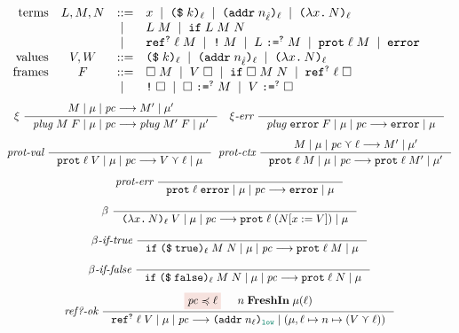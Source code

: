 {\begin{figure}[tbp]
  \raggedright
  {\small \[
  \begin{array}{rcll}
    \text{terms}  & L , M , N & ::=  & x \;\mid\; \text{\texttt{{(\$}}}\;{k}\text{\texttt{{)}}}_{\ell} \;\mid\; \text{\texttt{{(addr}}}\;{n_{\hat{\ell}}}\text{\texttt{{)}}}_{\ell} \;\mid\; \text{\texttt{{(${\lambda}$}}}{x}\text{\texttt{{.}}}\,{N}\text{\texttt{{)}}}_{\ell} \\
                           &  & \;\mid\; & L \; M \;\mid\; \text{\texttt{{if}}}\;{L}\;{M}\;{N} \\
                           &  & \;\mid\; & \text{\texttt{{ref}}}^{\text{\texttt{{?}}}}\;{\ell}\;{M} \;\mid\; \text{\texttt{{!}}}\;{M} \;\mid\; {L}\;\text{\texttt{{:=}}}^{\text{\texttt{{?}}}}\;{M} \;\mid\; \text{\texttt{{prot}}}\;{\ell}\;{M} \;\mid\; \mathtt{error} \\
    \text{values}     & V, W     & ::=  & \text{\texttt{{(\$}}}\;{k}\text{\texttt{{)}}}_{\ell} \;\mid\; \text{\texttt{{(addr}}}\;{n_{\hat{\ell}}}\text{\texttt{{)}}}_{\ell} \;\mid\; \text{\texttt{{(${\lambda}$}}}{x}\text{\texttt{{.}}}\,{N}\text{\texttt{{)}}}_{\ell} \\
    \text{frames} & F & ::= & \Box\;M \;\mid\; V\;\Box \;\mid\; \text{\texttt{{if}}}\;{\Box}\;{M}\;{N} \;\mid\; \text{\texttt{{ref}}}^{\text{\texttt{{?}}}}\;{\ell}\;{\Box} \\
                          & & \;\mid\; & \text{\texttt{{!}}}\;{\Box} \;\mid\; {\Box}\;\text{\texttt{{:=}}}^{\text{\texttt{{?}}}}\;{M} \;\mid\; {V}\;\text{\texttt{{:=}}}^{\text{\texttt{{?}}}}\;{\Box}
  \end{array}
  \]}
  {\small
  \begin{gather*}
  \xi~
  \inference
  {\reduce{M}{\mu}{\pc}{M'}{\mu'}}
  {\reduce{\mathit{plug}\;M\;F}{\mu}{\pc}{\mathit{plug}\;M'\;F}{\mu'}}
  \quad
  \xi\textit{-err}~
  \inference{}{\reduce{\mathit{plug}\;\key{error}\;F}{\mu}{\pc}{\key{error}}{\mu}}
  \\[1ex]
  \textit{prot-val}~
  \inference{}{\reduce{\dynprot{\ell}{V}}{\mu}{\pc}{V \curlyvee \ell}{\mu}}
  \;\;
  \textit{prot-ctx}~
  \inference
  {\reduce{M}{\mu}{\pc \curlyvee \ell}{M'}{\mu'}}
  {\reduce{\dynprot{\ell}{M}}{\mu}{\pc}{\dynprot{\ell}{M'}}{\mu'}}
  \\[1ex]
  \textit{prot-err}~
  \inference{}{\reduce{\dynprot{\ell}{\key{error}}}{\mu}{\pc}{\key{error}}{\mu}}
  \\[1ex]
  \beta~
  \inference{}{\reduce{\dynlam{x}{N}{\ell} \; V}{\mu}{\pc}{\dynprot{\ell}{(N [x := V])}}{\mu}}
  \\[1ex]
  \beta\textit{-if-true}~
  \inference{}{\reduce{\dynif{\dynconst{\true}{\ell}}{M}{N}}{\mu}{\pc}{\dynprot{\ell}{M}}{\mu}}
  \\[1ex]
  \beta\textit{-if-false}~
  \inference{}{\reduce{\dynif{\dynconst{\false}{\ell}}{M}{N}}{\mu}{\pc}{\dynprot{\ell}{N}}{\mu}}
  \\[1ex]
  \textit{ref?-ok}~
  \inference
  {\highlightred{\pc \preccurlyeq \ell} & n \; \mathbf{FreshIn} \; \mu(\ell)}
  {\reduce{\dynref{?}{\ell}{V}}{\mu}{\pc}{\dynaddr{n_{\ell}}{\low}}{(\mu, \ell \mapsto n \mapsto (V \curlyvee \ell))}}

\end{gather*}}
\end{figure}}
